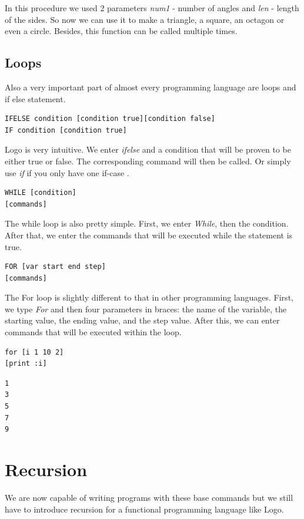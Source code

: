 \documentclass[a4paper, 11pt]{article}
\begin{document}
In this procedure we used 2 parameters \textit{num1} - number of angles and  \textit{len} - length of the sides. So now we can use it to make a triangle, a square, an octagon or even a circle. Besides, this function can be called multiple times.

\subsection{Loops}
Also a very important part of almost every programming language are loops and if else statement.

\begin{lstlisting}[title=If/Ifelse statement]
IFELSE condition [condition true][condition false]
IF condition [condition true]
\end{lstlisting}

Logo is very intuitive. We enter  \textit{ifelse}  and a condition that will be proven to be either true or false. The corresponding command will then be called.
Or simply use \textit{if} if you only have one if-case \cite{datatypes}.

\begin{lstlisting}[title=While-loop]
WHILE [condition]
[commands]
\end{lstlisting}

The while loop is also pretty simple. First, we enter \textit{While}, then the condition. After that, we enter the commands that will be executed while the statement is true.

\begin{lstlisting}[title=For-loop]
FOR [var start end step]
[commands]
\end{lstlisting}

The For loop is slightly different to that in other programming languages. First, we type \textit{For} and then four parameters in braces: the name of the variable, the starting value, the ending value, and the step value. After this, we can enter commands that will be executed within the loop.

\begin{lstlisting}[caption=Example of using For loop]
for [i 1 10 2]
[print :i]
\end{lstlisting}

\begin{lstlisting}[caption=Output of Listing 3]
1
3
5
7
9
\end{lstlisting}

\section{Recursion}
\label{sec:recursion}
We are now capable of writing programs with these base commands but we still have to introduce recursion for a functional programming language like Logo.
\end{document}
